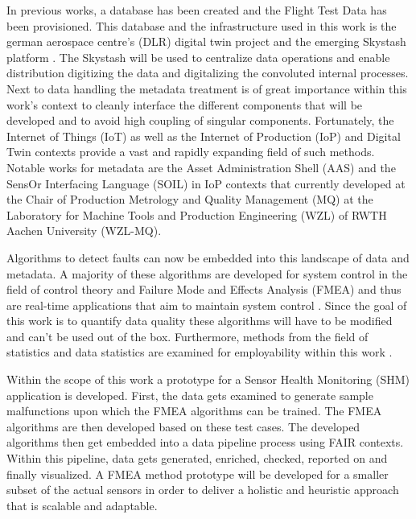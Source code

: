In previous works, a database has been created and the Flight Test Data has been provisioned. This database and the infrastructure used in this work is the german aerospace centre's (DLR) digital twin project and the emerging Skystash platform \cite{meyer_development_2020, arts_digital_2022}. The Skystash will be used to centralize data operations and enable distribution digitizing the data and digitalizing the convoluted internal processes. Next to data handling the metadata treatment is of great importance within this work's context to cleanly interface the different components that will be developed and to avoid high coupling of singular components. Fortunately, the Internet of Things (IoT) as well as the Internet of Production (IoP)\cite{pennekamp_towards_2019} and Digital Twin contexts provide a vast and rapidly expanding field of such methods. Notable works for metadata are the Asset Administration Shell (AAS) \cite{bader_details_2020} and the SensOr Interfacing Language (SOIL) \cite{behrens_domain-specific_2021, bodenbenner_model-driven_2022} in IoP contexts that currently developed at the Chair of Production Metrology and Quality Management (MQ) at the Laboratory for Machine Tools and Production Engineering (WZL) of RWTH Aachen University (WZL-MQ).

Algorithms to detect faults can now be embedded into this landscape of data and metadata. A majority of these algorithms are developed for system control in the field of control theory and Failure Mode and Effects Analysis (FMEA) and thus are real-time applications that aim to maintain system control \cite{isermann_fault-diagnosis_2006}. Since the goal of this work is to quantify data quality these algorithms will have to be modified and can't be used out of the box. Furthermore, methods from the field of statistics and data statistics are examined for employability within this work \cite{handl_multivariate_2017}.




Within the scope of this work a prototype for a Sensor Health Monitoring (SHM) application is developed. First, the data gets examined to generate sample malfunctions upon which the FMEA algorithms can be trained. The FMEA algorithms are then developed based on these test cases. The developed algorithms then get embedded into a data pipeline process using FAIR contexts. Within this pipeline, data gets generated, enriched, checked, reported on and finally visualized. A FMEA method prototype will be developed for a smaller subset of the actual sensors in order to deliver a holistic and heuristic approach that is scalable and adaptable.

